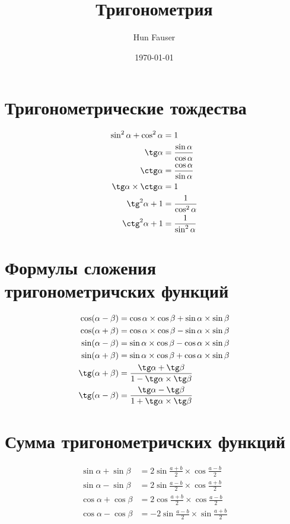 \documentclass[a4paper,12pt]{article}
\author{Hun Fauser}
\title{Тригонометрия}
\date{\today}
\begin{document}

\maketitle

\section{Тригонометрические тождества}

\begin{align*}
\sin^2\alpha + \cos^2\alpha &= 1 \\
\tg\alpha &= \frac{\sin\alpha}{\cos\alpha} \\
\ctg\alpha &= \frac{\cos\alpha}{\sin\alpha} \\
\tg\alpha \times \ctg\alpha &= 1 \\
\tg^2\alpha + 1 &= \frac{1}{\cos^2\alpha} \\
\ctg^2\alpha + 1 &= \frac{1}{\sin^2\alpha} \\
\end{align*}

\section{Формулы сложения тригонометричских функций}

\begin{align*}
\cos(\alpha - \beta) &= \cos\alpha \times \cos\beta + \sin\alpha \times \sin\beta \\
\cos(\alpha + \beta) &= \cos\alpha \times \cos\beta - \sin\alpha \times \sin\beta \\
\sin(\alpha - \beta) &= \sin\alpha \times \cos\beta - \cos\alpha \times \sin\beta \\
\sin(\alpha + \beta) &= \sin\alpha \times \cos\beta + \cos\alpha \times \sin\beta \\
\tg(\alpha + \beta) &= \frac{\tg\alpha + \tg\beta}{1 - \tg\alpha \times \tg\beta} \\
\tg(\alpha - \beta) &= \frac{\tg\alpha - \tg\beta}{1 + \tg\alpha \times \tg\beta} \\
\end{align*}

\section{Сумма тригонометричских функций}

\begin{align*}
\sin\alpha + \sin\beta &= 2\sin\frac{a + b}{2} \times \cos\frac{a - b}{2} \\
\sin\alpha - \sin\beta &= 2\sin\frac{a - b}{2} \times \cos\frac{a + b}{2} \\
\cos\alpha + \cos\beta &= 2\cos\frac{a + b}{2} \times \cos\frac{a - b}{2} \\
\cos\alpha - \cos\beta &= -2\sin\frac{a - b}{2} \times \sin\frac{a + b}{2} \\
\end{align*}
\end{document}
